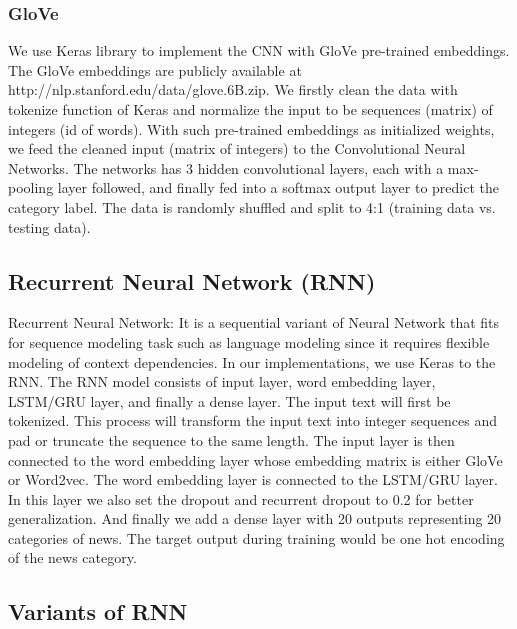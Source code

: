 \documentclass{article}
\begin{document}
\subsubsection{GloVe}
 We use Keras library to implement the CNN with GloVe pre-trained embeddings. The GloVe embeddings are publicly available at http://nlp.stanford.edu/data/glove.6B.zip. We firstly clean the data with tokenize function of Keras and normalize the input to be sequences (matrix) of integers (id of words). With such pre-trained embeddings as initialized weights, we feed the cleaned input (matrix of integers) to the Convolutional Neural Networks. The networks has 3 hidden convolutional layers, each with a max-pooling layer followed, and finally fed into a softmax output layer to predict the category label. The data is randomly shuffled and split to 4:1 (training data vs. testing data).

\subsection{Recurrent Neural Network (RNN)}
Recurrent Neural Network: It is a sequential variant of Neural Network that fits for sequence modeling task such as language modeling since it requires flexible modeling of context dependencies. In our implementations, we use Keras to the RNN. The RNN model  consists of input layer, word embedding layer, LSTM/GRU layer, and finally a dense layer. The input text will first be tokenized. This process will transform the input text into integer sequences and pad or truncate the sequence to the same length. The input layer is then connected to the word embedding layer whose embedding matrix is either GloVe or Word2vec. The word embedding layer is connected to the LSTM/GRU layer. In this layer we also set the dropout and recurrent dropout to 0.2 for better generalization. And finally we add a dense layer with 20 outputs representing 20 categories of news. The target output during training would be one hot encoding of the news category.


\subsection{Variants of RNN}
\end{document}
